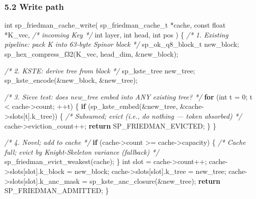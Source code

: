 \documentclass[
  11pt,
]{article}
\newenvironment{Shaded}{}{}
\newcommand{\CommentTok}[1]{\textcolor[rgb]{0.38,0.63,0.69}{\textit{#1}}}
\newcommand{\ControlFlowTok}[1]{\textcolor[rgb]{0.00,0.44,0.13}{\textbf{#1}}}
\newcommand{\DataTypeTok}[1]{\textcolor[rgb]{0.56,0.13,0.00}{#1}}
\newcommand{\DecValTok}[1]{\textcolor[rgb]{0.25,0.63,0.44}{#1}}
\newcommand{\NormalTok}[1]{#1}
\begin{document}
\hypertarget{write-path}{%
\subsubsection{5.2 Write path}\label{write-path}}

\begin{Shaded}
\begin{Highlighting}[]
\DataTypeTok{int}\NormalTok{ sp\_friedman\_cache\_write(}
\NormalTok{    sp\_friedman\_cache\_t *cache,}
    \DataTypeTok{const} \DataTypeTok{float}\NormalTok{ *K\_vec,        }\CommentTok{/* incoming Key */}
    \DataTypeTok{int}\NormalTok{ layer, }\DataTypeTok{int}\NormalTok{ head, }\DataTypeTok{int}\NormalTok{ pos}
\NormalTok{) \{}
    \CommentTok{/* 1. Existing pipeline: pack K into 63{-}byte Spinor block */}
\NormalTok{    sp\_ok\_q8\_block\_t new\_block;}
\NormalTok{    sp\_hex\_compress\_f32(K\_vec, head\_dim, \&new\_block);}

    \CommentTok{/* 2. KSTE: derive tree from block */}
\NormalTok{    sp\_kste\_tree new\_tree;}
\NormalTok{    sp\_kste\_encode(\&new\_block, \&new\_tree);}

    \CommentTok{/* 3. Sieve test: does new\_tree embed into ANY existing tree? */}
    \ControlFlowTok{for}\NormalTok{ (}\DataTypeTok{int}\NormalTok{ t = }\DecValTok{0}\NormalTok{; t \textless{} cache{-}\textgreater{}count; ++t) \{}
        \ControlFlowTok{if}\NormalTok{ (sp\_kste\_embed(\&new\_tree, \&cache{-}\textgreater{}slots[t].k\_tree)) \{}
            \CommentTok{/* Subsumed; evict (i.e., do nothing — token absorbed) */}
\NormalTok{            cache{-}\textgreater{}eviction\_count++;}
            \ControlFlowTok{return}\NormalTok{ SP\_FRIEDMAN\_EVICTED;}
\NormalTok{        \}}
\NormalTok{    \}}

    \CommentTok{/* 4. Novel; add to cache */}
    \ControlFlowTok{if}\NormalTok{ (cache{-}\textgreater{}count \textgreater{}= cache{-}\textgreater{}capacity) \{}
        \CommentTok{/* Cache full; evict by Knight{-}Skeleton variance (fallback) */}
\NormalTok{        sp\_friedman\_evict\_weakest(cache);}
\NormalTok{    \}}
    \DataTypeTok{int}\NormalTok{ slot = cache{-}\textgreater{}count++;}
\NormalTok{    cache{-}\textgreater{}slots[slot].k\_block = new\_block;}
\NormalTok{    cache{-}\textgreater{}slots[slot].k\_tree  = new\_tree;}
\NormalTok{    cache{-}\textgreater{}slots[slot].k\_anc\_mask = sp\_kste\_anc\_closure(\&new\_tree);}
    \ControlFlowTok{return}\NormalTok{ SP\_FRIEDMAN\_ADMITTED;}
\NormalTok{\}}
\end{Highlighting}
\end{Shaded}
\end{document}
